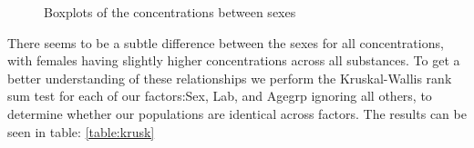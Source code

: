 \documentclass{article}
\begin{document}
\begin{figure}
          \caption{Boxplots of the concentrations between sexes}
          \label{fig:BoxSex}
      \end{figure}
		
  There seems to be a subtle difference between the sexes for all concentrations, with females having slightly higher concentrations across all substances. To get a better understanding of these relationships we perform the Kruskal-Wallis rank sum test for each of our factors:Sex, Lab, and Agegrp ignoring all others, to determine whether our populations are identical across factors. The results can be seen in table: \ref{table:krusk}
  
\end{document}
